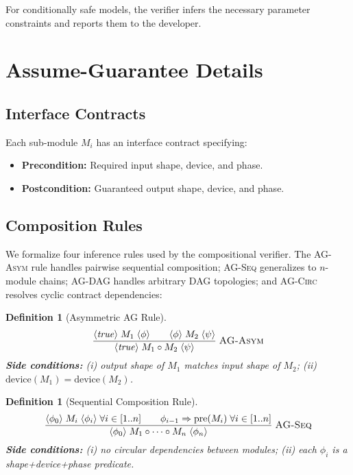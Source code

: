 \documentclass[11pt]{article}
\newtheorem{definition}[theorem]{Definition}
\begin{document}
For conditionally safe models, the verifier infers the necessary
parameter constraints and reports them to the developer.


\section{Assume-Guarantee Details}\label{app:ag-details}

\subsection{Interface Contracts}

Each sub-module $M_i$ has an interface contract specifying:
\begin{itemize}[leftmargin=2em]
  \item \textbf{Precondition:} Required input shape, device,
    and phase.
  \item \textbf{Postcondition:} Guaranteed output shape, device,
    and phase.
\end{itemize}

\subsection{Composition Rules}

We formalize four inference rules used by the compositional verifier.
The \textsc{AG-Asym} rule handles pairwise sequential composition;
\textsc{AG-Seq} generalizes to $n$-module chains;
\textsc{AG-DAG} handles arbitrary DAG topologies;
and \textsc{AG-Circ} resolves cyclic contract dependencies:

\begin{definition}[Asymmetric AG Rule]
\[
\frac{
  \langle \mathit{true} \rangle\; M_1 \;\langle \phi \rangle
  \qquad
  \langle \phi \rangle\; M_2 \;\langle \psi \rangle
}{
  \langle \mathit{true} \rangle\; M_1 \circ M_2 \;\langle \psi \rangle
}
\;\textsc{AG-Asym}
\]
\textbf{Side conditions:}
(i) output shape of $M_1$ matches input shape of $M_2$;
(ii) $\mathrm{device}(M_1) = \mathrm{device}(M_2)$.
\end{definition}

\begin{definition}[Sequential Composition Rule]
\[
\frac{
  \langle \phi_0 \rangle\; M_i \;\langle \phi_i \rangle \;\forall i \in [1..n]
  \qquad
  \phi_{i-1} \Rightarrow \mathrm{pre}(M_i) \;\forall i \in [1..n]
}{
  \langle \phi_0 \rangle\; M_1 \circ \cdots \circ M_n \;\langle \phi_n \rangle
}
\;\textsc{AG-Seq}
\]
\textbf{Side conditions:}
(i) no circular dependencies between modules;
(ii) each $\phi_i$ is a shape+device+phase predicate.
\end{definition}
\end{document}
